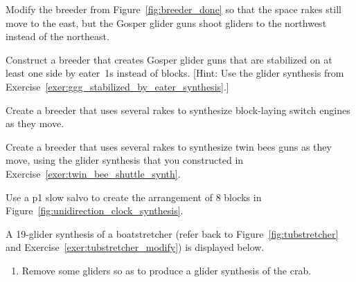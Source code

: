 \begin{multicols}{2}
	
	\mfilbreak
	
	
	\begin{problem}\label{exer:breeder_done_northwest} 
		Modify the breeder from Figure~\ref{fig:breeder_done} so that the space rakes still move to the east, but the Gosper glider guns shoot gliders to the northwest instead of the northeast.
	\end{problem}
	
	
	\mfilbreak
	
	
	\begin{problem}\label{exer:ggg_eater_side_breeder} 
		Construct a breeder that creates Gosper glider guns that are stabilized on at least one side by eater~1s instead of blocks. [Hint: Use the glider synthesis from Exercise~\ref{exer:ggg_stabilized_by_eater_synthesis}.]
	\end{problem}
	
	
	\mfilbreak
	
	
	\begin{problem}\label{exer:block_laying_switch_breeder} 
		Create a breeder that uses several rakes to synthesize block-laying switch engines as they move.
		
	\end{problem}
	
	
	\mfilbreak
	
	
	\begin{problem}\label{exer:new_gun_breeder} 
		Create a breeder that uses several rakes to synthesize twin bees guns as they move, using the glider synthesis that you constructed in Exercise~\ref{exer:twin_bee_shuttle_synth}.
	\end{problem}
	
	
	\mfilbreak
	
	
	\begin{problem}\label{exer:slow_salvo_8_blocks} 
		Use a p1 slow salvo to create the arrangement of $8$ blocks in Figure~\ref{fig:unidirection_clock_synthesis}.
	\end{problem}
	
	
	\mfilbreak
	
	
	\begin{problemstar}\label{exer:large_still_life_synth}
		A 19-glider synthesis of a boatstretcher (refer back to Figure~\ref{fig:tubstretcher} and Exercise~\ref{exer:tubstretcher_modify}) is displayed below.
		\begin{center}
		\end{center}
		\begin{enumerate}[label=\bf\color{ocre}(\alph*)]
			\item {} Remove some gliders so as to produce a glider synthesis of the crab.
			

\end{enumerate}
\end{problemstar}
\end{multicols}
